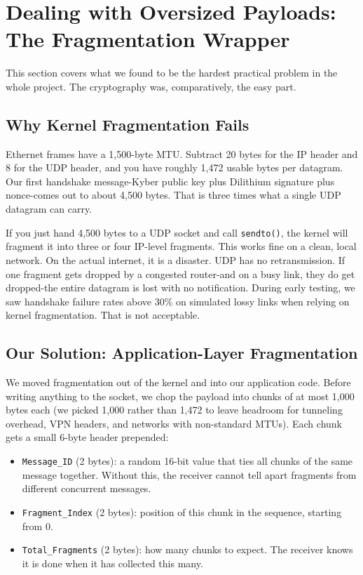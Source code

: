 \documentclass[10pt, conference, letterpaper]{IEEEtran}
\begin{document}
\section{Dealing with Oversized Payloads: The Fragmentation Wrapper}
This section covers what we found to be the hardest practical problem in the whole project. The cryptography was, comparatively, the easy part.

\subsection{Why Kernel Fragmentation Fails}
Ethernet frames have a 1,500-byte MTU. Subtract 20 bytes for the IP header and 8 for the UDP header, and you have roughly 1,472 usable bytes per datagram. Our first handshake message-Kyber public key plus Dilithium signature plus nonce-comes out to about 4,500 bytes. That is three times what a single UDP datagram can carry.

If you just hand 4,500 bytes to a UDP socket and call \texttt{sendto()}, the kernel will fragment it into three or four IP-level fragments. This works fine on a clean, local network. On the actual internet, it is a disaster. UDP has no retransmission. If one fragment gets dropped by a congested router-and on a busy link, they do get dropped-the entire datagram is lost with no notification. During early testing, we saw handshake failure rates above 30\% on simulated lossy links when relying on kernel fragmentation. That is not acceptable.

\subsection{Our Solution: Application-Layer Fragmentation}
We moved fragmentation out of the kernel and into our application code. Before writing anything to the socket, we chop the payload into chunks of at most 1,000 bytes each (we picked 1,000 rather than 1,472 to leave headroom for tunneling overhead, VPN headers, and networks with non-standard MTUs). Each chunk gets a small 6-byte header prepended:

\begin{itemize}
    \item \texttt{Message\_ID} (2 bytes): a random 16-bit value that ties all chunks of the same message together. Without this, the receiver cannot tell apart fragments from different concurrent messages.
    \item \texttt{Fragment\_Index} (2 bytes): position of this chunk in the sequence, starting from 0.
    \item \texttt{Total\_Fragments} (2 bytes): how many chunks to expect. The receiver knows it is done when it has collected this many.
\end{itemize}
\end{document}
